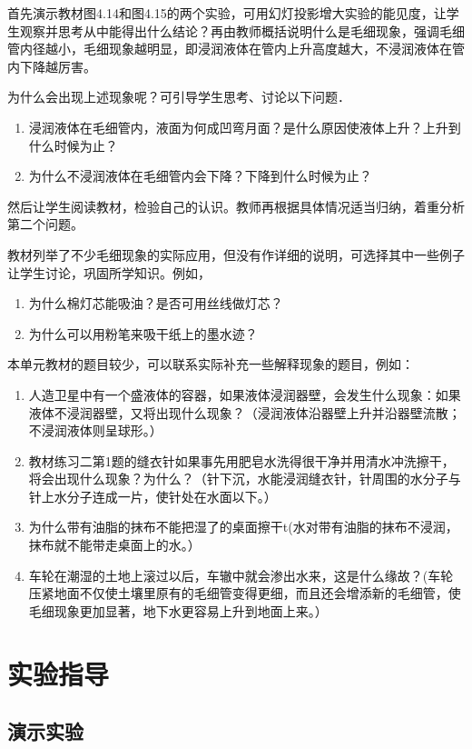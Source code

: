 首先演示教材图4.14和图4.15的两个实验，可用幻灯投影增大实验的能见度，让学生观察并思考从中能得出什么结论？再由教师概括说明什么是毛细现象，强调毛细管内径越小，毛细现象越明显，即浸润液体在管内上升高度越大，不浸润液体在管内下降越厉害。

为什么会出现上述现象呢？可引导学生思考、讨论以下问题．
\begin{enumerate}
    \item 浸润液体在毛细管内，液面为何成凹弯月面？是什么原因使液体上升？上升到什么时候为止？
\item 为什么不浸润液体在毛细管内会下降？下降到什么时候为止？
\end{enumerate}
然后让学生阅读教材，检验自己的认识。教师再根据具体情况适当归纳，着重分析第二个问题。

教材列举了不少毛细现象的实际应用，但没有作详细的说明，可选择其中一些例子让学生讨论，巩固所学知识。例如，
\begin{enumerate}
    \item 为什么棉灯芯能吸油？是否可用丝线做灯芯？    \item 为什么可以用粉笔来吸干纸上的墨水迹？
\end{enumerate}

本单元教材的题目较少，可以联系实际补充一些解释现象的题目，例如：
\begin{enumerate}
\item 人造卫星中有一个盛液体的容器，如果液体浸润器壁，会发生什么现象：如果液体不浸润器壁，又将出现什么现象？（浸润液体沿器壁上升并沿器壁流散；不浸润液体则呈球形。）
\item 教材练习二第1题的缝衣针如果事先用肥皂水洗得很干净并用清水冲洗擦干，将会出现什么现象？为什么？（针下沉，水能浸润缝衣针，针周围的水分子与针上水分子连成一片，使针处在水面以下。）
\item 为什么带有油脂的抹布不能把湿了的桌面擦干t(水对带有油脂的抹布不浸润，抹布就不能带走桌面上的水。）
\item 车轮在潮湿的土地上滚过以后，车辙中就会渗出水来，这是什么缘故？(车轮压紧地面不仅使土壤里原有的毛细管变得更细，而且还会增添新的毛细管，使毛细现象更加显著，地下水更容易上升到地面上来。）
\end{enumerate}

\section{实验指导}
\subsection{演示实验}
